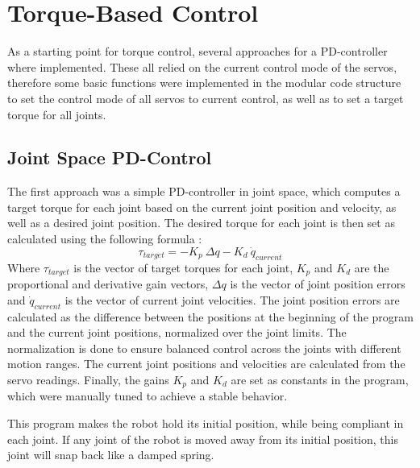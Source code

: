 \section{Torque-Based Control}
As a starting point for torque control, several approaches for a PD-controller where implemented. These all relied on the current control mode of the servos,
therefore some basic functions were implemented in the modular code structure to set the control mode of all servos to current control,
as well as to set a target torque for all joints.

\subsection{Joint Space PD-Control}
The first approach was a simple PD-controller in joint space, which computes a target torque for each joint based on the current joint position and velocity,
as well as a desired joint position. The desired torque for each joint is then set as calculated using the following formula
\parencite{murrayMathematicalIntroductionRobotic2017}:
\begin{equation}
    \tau_{target} = - K_p \ \Delta q - K_d \ \dot{q}_{current}
\end{equation}
Where $\tau_{target}$ is the vector of target torques for each joint, $K_p$ and $K_d$ are the proportional and derivative gain vectors, $\Delta q$ is the vector of joint position 
errors and $\dot{q}_{current}$ is the vector of current joint velocities.
The joint position errors are calculated as the difference between the positions at the beginning of the program and the current joint positions, normalized over the joint limits.
The normalization is done to ensure balanced control across the joints with different motion ranges.
The current joint positions and velocities are calculated from the servo readings.
Finally, the gains $K_p$ and $K_d$ are set as constants in the program, which were manually tuned to achieve a stable behavior.

This program makes the robot hold its initial position, while being compliant in each joint. If any joint of the robot is moved away from its initial position,
this joint will snap back like a damped spring.


